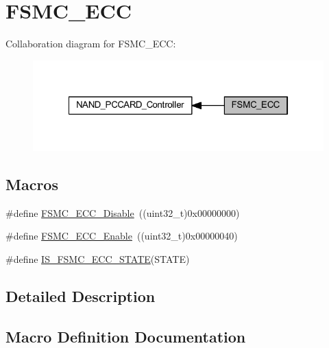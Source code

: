 \hypertarget{group___f_s_m_c___e_c_c}{}\section{F\+S\+M\+C\+\_\+\+E\+CC}
\label{group___f_s_m_c___e_c_c}
Collaboration diagram for F\+S\+M\+C\+\_\+\+E\+CC\+:
\nopagebreak
\begin{figure}[H]
\begin{center}
\leavevmode
\includegraphics[width=322pt]{group___f_s_m_c___e_c_c}
\end{center}
\end{figure}
\subsection*{Macros}
\begin{DoxyCompactItemize}
\item 
\#define \hyperlink{group___f_s_m_c___e_c_c_ga9a3264c0718f5023fd106abea7ef806d}{F\+S\+M\+C\+\_\+\+E\+C\+C\+\_\+\+Disable}~((uint32\+\_\+t)0x00000000)
\item 
\#define \hyperlink{group___f_s_m_c___e_c_c_ga9d940243830695412d4c98228bb5b763}{F\+S\+M\+C\+\_\+\+E\+C\+C\+\_\+\+Enable}~((uint32\+\_\+t)0x00000040)
\item 
\#define \hyperlink{group___f_s_m_c___e_c_c_gaf1a7cb45edd8707bf4ea8aac96799c77}{I\+S\+\_\+\+F\+S\+M\+C\+\_\+\+E\+C\+C\+\_\+\+S\+T\+A\+TE}(S\+T\+A\+TE)
\end{DoxyCompactItemize}


\subsection{Detailed Description}


\subsection{Macro Definition Documentation}
\mbox{\label{group___f_s_m_c___e_c_c_ga9a3264c0718f5023fd106abea7ef806d}} 
